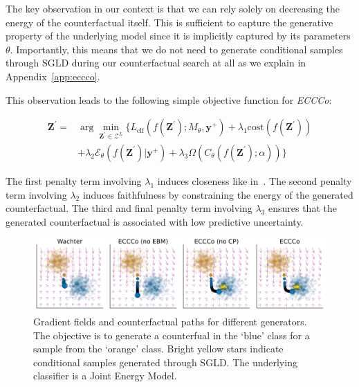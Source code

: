 The key observation in our context is that we can rely solely on decreasing the energy of the counterfactual itself. This is sufficient to capture the generative property of the underlying model since it is implicitly captured by its parameters $\theta$. Importantly, this means that we do not need to generate conditional samples through SGLD during our counterfactual search at all as we explain in Appendix~\ref{app:eccco}.

This observation leads to the following simple objective function for \textit{ECCCo}:

\begin{equation} \label{eq:eccco}
  \begin{aligned}
  \mathbf{Z}^\prime =& \arg \min_{\mathbf{Z}^\prime \in \mathcal{Z}^L} \{  {L_{\text{clf}}(f(\mathbf{Z}^\prime);M_{\theta},\mathbf{y}^+)}+ \lambda_1 {\text{cost}(f(\mathbf{Z}^\prime)) } \\
  &+ \lambda_2 \mathcal{E}_{\theta}(f(\mathbf{Z}^\prime)|\mathbf{y}^+) + \lambda_3 \Omega(C_{\theta}(f(\mathbf{Z}^\prime);\alpha)) \} 
  \end{aligned} 
\end{equation}

The first penalty term involving $\lambda_1$ induces closeness like in~\citet{wachter2017counterfactual}. The second penalty term involving $\lambda_2$ induces faithfulness by constraining the energy of the generated counterfactual. The third and final penalty term involving $\lambda_3$ ensures that the generated counterfactual is associated with low predictive uncertainty.

\begin{figure}
  \centering
  \includegraphics[width=1.0\linewidth]{../artifacts/results/images/poc_gradient_fields.png}
  \caption{Gradient fields and counterfactual paths for different generators. The objective is to generate a counterfual in the `blue' class for a sample from the `orange' class. Bright yellow stars indicate conditional samples generated through SGLD. The underlying classifier is a Joint Energy Model.}\label{fig:poc}
\end{figure}  

